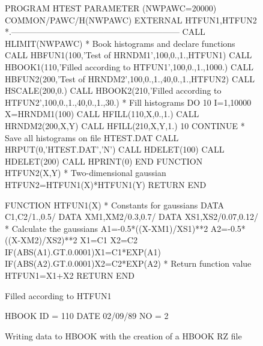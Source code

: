 \begin{figure}[p]
\begin{XMPfont}{8}
      PROGRAM HTEST
      PARAMETER (NWPAWC=20000)
      COMMON/PAWC/H(NWPAWC)
      EXTERNAL HTFUN1,HTFUN2
*.------------------------------------------------------------
      CALL HLIMIT(NWPAWC)
*             Book histograms and declare functions
      CALL HBFUN1(100,'Test of HRNDM1',100,0.,1.,HTFUN1)
      CALL HBOOK1(110,'Filled according to HTFUN1',100,0.,1.,1000.)
      CALL HBFUN2(200,'Test of HRNDM2',100,0.,1.,40,0.,1.,HTFUN2)
      CALL HSCALE(200,0.)
      CALL HBOOK2(210,'Filled according to HTFUN2',100,0.,1.,40,0.,1.,30.)
*             Fill histograms
      DO 10 I=1,10000
         X=HRNDM1(100)
         CALL HFILL(110,X,0.,1.)
         CALL HRNDM2(200,X,Y)
         CALL HFILL(210,X,Y,1.)
  10  CONTINUE
*             Save all histograms on file HTEST.DAT
      CALL HRPUT(0,'HTEST.DAT','N')
      CALL HDELET(100)
      CALL HDELET(200)
      CALL HPRINT(0)
      END
      FUNCTION HTFUN2(X,Y)
*             Two-dimensional gaussian
      HTFUN2=HTFUN1(X)*HTFUN1(Y)
      RETURN
      END
 
      FUNCTION HTFUN1(X)
*             Constants for gaussians
      DATA C1,C2/1.,0.5/
      DATA XM1,XM2/0.3,0.7/
      DATA XS1,XS2/0.07,0.12/
*             Calculate the gaussians
      A1=-0.5*((X-XM1)/XS1)**2
      A2=-0.5*((X-XM2)/XS2)**2
      X1=C1
      X2=C2
      IF(ABS(A1).GT.0.0001)X1=C1*EXP(A1)
      IF(ABS(A2).GT.0.0001)X2=C2*EXP(A2)
*             Return function value
      HTFUN1=X1+X2
      RETURN
      END
\end{XMPfont}

\caption{Writing data to HBOOK with the creation of a HBOOK RZ file}
\label{FEX1IN}

\begin{minipage}[t]{.495\textwidth}
\begin{XMPfrac}{3.3}
Filled according to HTFUN1
 
HBOOK     ID =       110                                        DATE  02/09/89               NO =  2
 

\end{XMPfrac}
\end{minipage}
\end{figure}
